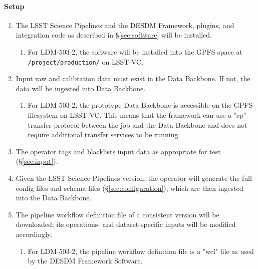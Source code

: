 \paragraph{Setup}
\begin{enumerate}
  \item{The LSST Science Pipelines and the DESDM Framework, plugins, and integration code as described in \S\ref{sec:software} will be installed.}
  \begin{enumerate}
    \item{For LDM-503-2, the software will be installed into the GPFS space at \texttt{/project/production/} on LSST-VC.}
  \end{enumerate}
  \item{Input raw and calibration data must exist in the Data Backbone. If not, the data will be ingested into Data Backbone.}  
  \begin{enumerate}
    \item{For LDM-503-2, the prototype Data Backbone is accessible on the GPFS filesystem on LSST-VC.   This means that the framework can use a "cp" transfer protocol between the job and the Data Backbone and does not require additional transfer services to be running.}
  \end{enumerate}
  \item{The operator tags and blacklists input data as appropriate for test (\S\ref{sec:input}).}
  \item{Given the LSST Science Pipelines version, the operator will generate the full config files and schema files (\S\ref{sec:configuration}), which are then ingested into the Data Backbone.}
  \item{The pipeline workflow definition file of a consistent version will be downloaded; its operations- and dataset-specific inputs will be modified accordingly.}
  \begin{enumerate}
    \item{For LDM-503-2, the pipeline workflow definition file is a "wcl" file as used by the DESDM Framework Software.}
  \end{enumerate}
\end{enumerate}

